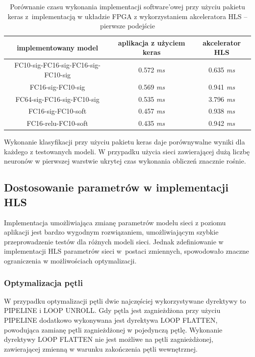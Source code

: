 \begin{table}[h] \centering
  \caption{Porównanie czasu wykonania implementacji software'owej przy użyciu pakietu keras z~implementacją w układzie FPGA z wykorzystaniem akceleratora HLS -- pierwsze podejście}
  \centering
  \begin{tabular} {c|c|c} \hline \label{tab:czas-wykonania}  
    implementowany model & aplikacja z użyciem keras & akcelerator HLS\\ \hline \hline
    FC10-sig-FC16-sig-FC16-sig-FC10-sig & 0.572 \emph{ms} & 0.635 \emph{ms} \\
    FC16-sig-FC10-sig & 0.569 \emph{ms} & 0.941 \emph{ms} \\
    FC64-sig-FC16-sig-FC10-sig & 0.535 \emph{ms} & 3.796 \emph{ms} \\
    FC16-sig-FC10-soft & 0.457 \emph{ms} & 0.938 \emph{ms} \\
    FC16-relu-FC10-soft & 0.435 \emph{ms} & 0.942 \emph{ms} \\
  \end{tabular}
\end{table}

Wykonanie klasyfikacji przy użyciu pakietu keras daje porównywalne wyniki dla każdego z testowanych modeli. W przypadku użycia sieci zawierającej dużą liczbę neuronów w pierwszej warstwie ukrytej czas wykonania obliczeń znacznie rośnie.



\subsection{Dostosowanie parametrów w implementacji HLS}

Implementacja umożliwiająca zmianę parametrów modelu sieci z poziomu aplikacji jest bardzo wygodnym 
rozwiązaniem, umożliwiającym szybkie przeprowadzenie testów dla różnych modeli sieci. Jednak 
zdefiniowanie w implementacji HLS parametrów sieci w~postaci zmiennych, spowodowało znaczne 
ograniczenia w możliwościach optymalizacji. 

\subsubsection{Optymalizacja pętli}

W przypadku optymalizacji pętli dwie najczęściej wykorzystywane dyrektywy to PIPELINE i LOOP UNROLL. Gdy pętla jest zagnieżdżona przy użyciu PIPELINE dodatkowo wykonywana jest dyrektywa LOOP FLATTEN, powodująca zamianę pętli zagnieżdżonej w pojedynczą pętlę. Wykonanie dyrektywy LOOP FLATTEN nie jest możliwe na pętli zagnieżdżonej, zawierającej zmienną w warunku zakończenia pętli wewnętrznej.

